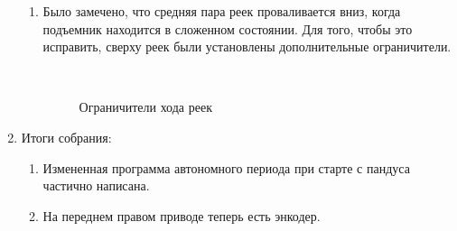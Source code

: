 \begin{enumerate}
\begin{enumerate}
	   \item Было замечено, что средняя пара реек проваливается вниз, когда подъемник находится в сложенном состоянии. Для того, чтобы это исправить, сверху реек были установлены дополнительные ограничители.
	   \begin{figure}[H]
	   	\begin{minipage}[h]{0.2\linewidth}
	   		\center  
	   	\end{minipage}
	   	\begin{minipage}[h]{0.6\linewidth}
	   		\caption{Ограничители хода реек}
	   	\end{minipage}
	   \end{figure}

	\end{enumerate}
	
	\item Итоги собрания:
	\begin{enumerate}
		
		\item Измененная программа автономного периода при старте с пандуса частично написана.
		
		\item На переднем правом приводе теперь есть энкодер.
		

\end{enumerate}
\end{enumerate}
